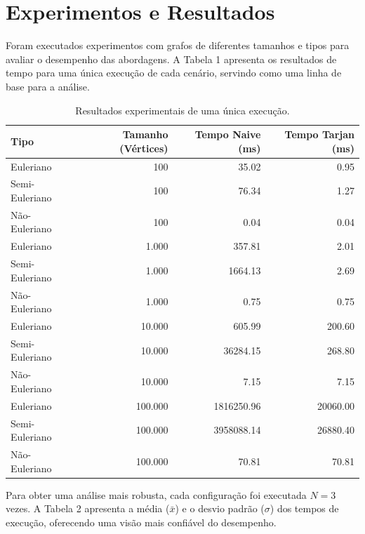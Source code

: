 \documentclass[12pt]{article}
\begin{document}
\section{Experimentos e Resultados}
Foram executados experimentos com grafos de diferentes tamanhos e tipos para avaliar o desempenho das abordagens. A Tabela 1 apresenta os resultados de tempo para uma única execução de cada cenário, servindo como uma linha de base para a análise.

\begin{table}[h!]
\centering
\caption{Resultados experimentais de uma única execução.}
\label{tab:original}
\begin{tabular}{lrrr}
\toprule
\textbf{Tipo} & \textbf{Tamanho (Vértices)} & \textbf{Tempo Naive (ms)} & \textbf{Tempo Tarjan (ms)} \\
\midrule
Euleriano & 100 & 35.02 & 0.95 \\
Semi-Euleriano & 100 & 76.34 & 1.27 \\
Não-Euleriano & 100 & 0.04 & 0.04 \\
\midrule
Euleriano & 1.000 & 357.81 & 2.01 \\
Semi-Euleriano & 1.000 & 1664.13 & 2.69 \\
Não-Euleriano & 1.000 & 0.75 & 0.75 \\
\midrule
Euleriano & 10.000 & 605.99 & 200.60 \\
Semi-Euleriano & 10.000 & 36284.15 & 268.80 \\
Não-Euleriano & 10.000 & 7.15 & 7.15 \\
\midrule
Euleriano & 100.000 & 1816250.96 & 20060.00 \\
Semi-Euleriano & 100.000 & 3958088.14 & 26880.40 \\
Não-Euleriano & 100.000 & 70.81 & 70.81 \\
\bottomrule
\end{tabular}
\end{table}

Para obter uma análise mais robusta, cada configuração foi executada $N=3$ vezes. A Tabela 2 apresenta a média ($\bar{x}$) e o desvio padrão ($\sigma$) dos tempos de execução, oferecendo uma visão mais confiável do desempenho.
\end{document}
